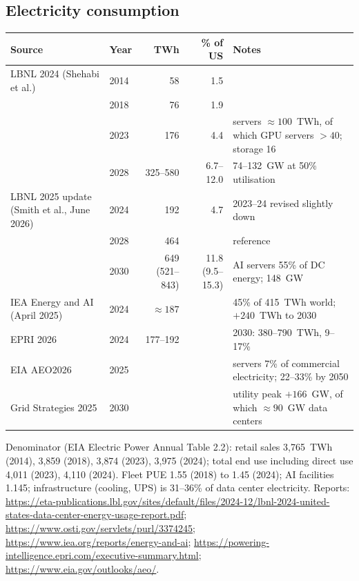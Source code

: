 \documentclass[11pt]{article}
\begin{document}
\subsection{Electricity consumption}
\begin{center}\footnotesize
\begin{tabular}{p{3.6cm}lrrp{5.6cm}}
\toprule
Source & Year & TWh & \% of US & Notes \\
\midrule
LBNL 2024 (Shehabi et al.) & 2014 & 58 & 1.5 & \\
 & 2018 & 76 & 1.9 & \\
 & 2023 & 176 & 4.4 & servers $\approx 100$~TWh, of which GPU servers $>40$; storage 16 \\
 & 2028 & 325--580 & 6.7--12.0 & 74--132~GW at 50\% utilisation \\
LBNL 2025 update (Smith et al., June 2026) & 2024 & 192 & 4.7 & 2023--24 revised slightly down \\
 & 2028 & 464 & & reference \\
 & 2030 & 649 (521--843) & 11.8 (9.5--15.3) & AI servers 55\% of DC energy; 148~GW \\
IEA Energy and AI (April 2025) & 2024 & $\approx 187$ & & 45\% of 415~TWh world; $+240$~TWh to 2030 \\
EPRI 2026 & 2024 & 177--192 & & 2030: 380--790~TWh, 9--17\% \\
EIA AEO2026 & 2025 & & & servers 7\% of commercial electricity; 22--33\% by 2050 \\
Grid Strategies 2025 & 2030 & & & utility peak $+166$~GW, of which $\approx 90$~GW data centers \\
\bottomrule
\end{tabular}
\end{center}
Denominator (EIA Electric Power Annual Table 2.2): retail sales 3{,}765~TWh (2014), 3{,}859 (2018), 3{,}874 (2023), 3{,}975 (2024); total end use including direct use 4{,}011 (2023), 4{,}110 (2024). Fleet PUE 1.55 (2018) to 1.45 (2024); AI facilities 1.145; infrastructure (cooling, UPS) is 31--36\% of data center electricity. Reports: \url{https://eta-publications.lbl.gov/sites/default/files/2024-12/lbnl-2024-united-states-data-center-energy-usage-report.pdf}; \url{https://www.osti.gov/servlets/purl/3374245}; \url{https://www.iea.org/reports/energy-and-ai}; \url{https://powering-intelligence.epri.com/executive-summary.html}; \url{https://www.eia.gov/outlooks/aeo/}.
\end{document}
